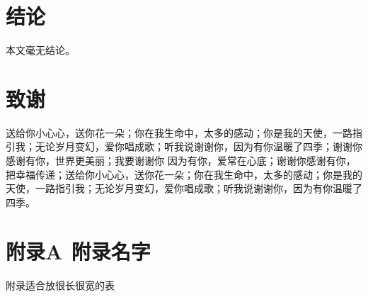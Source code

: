 {%
\newpage

\section*{结论} %

本文毫无结论。


\newpage




\newpage

\section*{致谢}

送给你小心心，送你花一朵；你在我生命中，太多的感动；你是我的天使，一路指引我；无论岁月变幻，爱你唱成歌；听我说谢谢你，因为有你温暖了四季；谢谢你感谢有你，世界更美丽；我要谢谢你 因为有你，爱常在心底；谢谢你感谢有你，把幸福传递；送给你小心心，送你花一朵；你在我生命中，太多的感动；你是我的天使，一路指引我；无论岁月变幻，爱你唱成歌；听我说谢谢你，因为有你温暖了四季。


\appendix
\newpage

\section*{附录A$\ \ $附录名字} %
\setcounter{table}{0}
\renewcommand\thetable{\text{A}\Alph{section}\arabic{table}} %

\begin{table}[htbp]
	\setlength{\abovecaptionskip}{0.1cm}
	\setlength{\belowcaptionskip}{-0.1cm}
	\centering
	\footnotesize %
	\caption{附录适合放很长很宽的表}
	

\end{table}}

